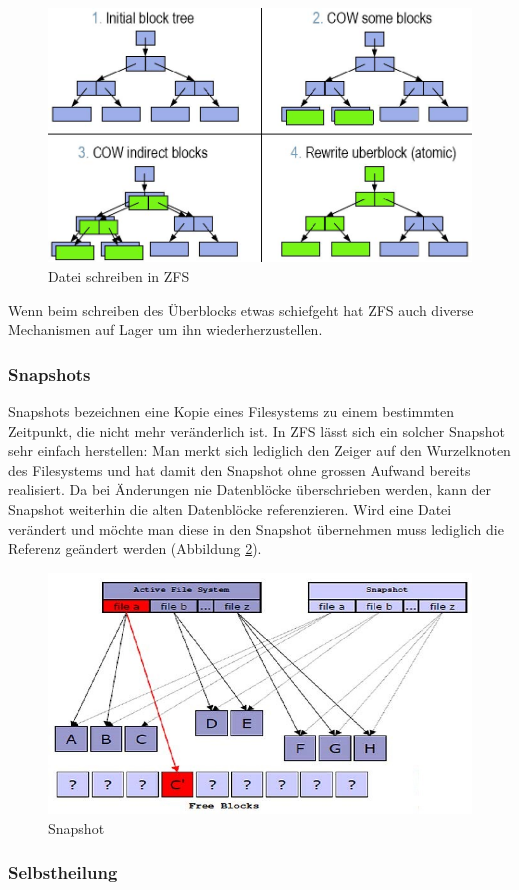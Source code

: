 \begin{figure}
\centering
\includegraphics[width=0.7\linewidth]{fig/write-file-zfs}
\caption{Datei schreiben in ZFS}
\label{fig:write-file-zfs}
\end{figure}
Wenn beim schreiben des Überblocks etwas schiefgeht hat ZFS auch diverse Mechanismen auf Lager um ihn wiederherzustellen.

\subsubsection{Snapshots}

Snapshots bezeichnen eine Kopie eines Filesystems zu einem bestimmten Zeitpunkt, die nicht mehr veränderlich ist. In ZFS lässt sich ein solcher Snapshot sehr einfach herstellen: Man merkt sich lediglich den Zeiger auf den Wurzelknoten des Filesystems und hat damit den Snapshot ohne grossen Aufwand bereits realisiert. Da bei Änderungen nie Datenblöcke überschrieben werden, kann der Snapshot weiterhin die alten Datenblöcke referenzieren. Wird eine Datei verändert und möchte man diese in den Snapshot übernehmen muss lediglich die Referenz geändert werden (Abbildung \ref{fig:snapshot}).

\begin{figure}
\centering
\includegraphics[width=0.7\linewidth]{fig/snapshot}
\caption{Snapshot}
\label{fig:snapshot}
\end{figure}

\subsubsection{Selbstheilung}

